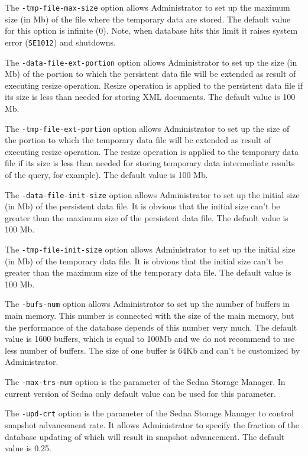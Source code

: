 \documentclass[a4paper,12pt]{article}
\begin{document}
The \verb!-tmp-file-max-size! option allows Administrator to set up the maximum
size (in Mb) of the file where the temporary data are stored. The default value
for this option is infinite (0). Note, when database hits this limit it raises
system error (\verb!SE1012!) and shutdowns.

The \verb!-data-file-ext-portion! option allows Administrator to set up the size
(in Mb) of the portion to which the persistent data file will be extended as
result of executing resize operation. Resize operation is applied to the
persistent data file if its size is less than needed for storing XML documents.
The default value is 100 Mb.

The \verb!-tmp-file-ext-portion! option allows Administrator to set up the size
of the portion to which the temporary data file will be extended as result of
executing resize operation. The resize operation is applied to the temporary
data file if its size is less than needed for storing temporary data
intermediate results of the query, for example). The default value is 100 Mb.

The \verb!-data-file-init-size! option allows Administrator to set up the
initial size (in Mb) of the persistent data file. It is obvious that the initial
size can't be greater than the maximum size of the persistent data file. The
default value is 100 Mb.

The \verb!-tmp-file-init-size! option allows Administrator to set up the initial
size (in Mb) of the temporary data file. It is obvious that the initial size
can't be greater than the maximum size of the temporary data file. The default
value is 100 Mb.

The \verb!-bufs-num! option allows Administrator to set up the number of buffers
in main memory. This number is connected with the size of the main memory, but
the performance of the database depends of this number very much. The default
value is 1600 buffers, which is equal to 100Mb and we do not recommend to use
less number of buffers. The size of one buffer is 64Kb and can't be customized
by Administrator.

The \verb!-max-trs-num! option is the parameter of the Sedna Storage Manager. In
current version of Sedna only default value can be used for this parameter.

The \verb!-upd-crt! option is the parameter of the Sedna Storage Manager to
control snapshot advancement rate. It allows Administrator to specify the
fraction of the database updating of which will result in snapshot advancement.
The default value is 0.25.
\end{document}
